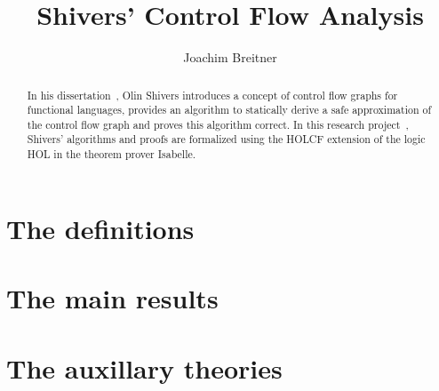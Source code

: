 \documentclass[11pt,a4paper,parskip,abstract]{scrartcl}
\begin{document}
\title{Shivers' Control Flow Analysis}
\author{Joachim Breitner}
\maketitle

\begin{abstract}
  In his dissertation~\cite{Shivers}, Olin Shivers introduces a concept of control flow graphs
  for functional languages, provides an algorithm to statically derive a safe
  approximation of the control flow graph and proves this algorithm correct. In
  this research project~\cite{Studienarbeit}, Shivers' algorithms and proofs are formalized
  using the HOLCF extension of the logic HOL in the theorem prover Isabelle.
\end{abstract}

\tableofcontents

%

\part{The definitions}





\part{The main results}





\part{The auxillary theories}









\end{document}
